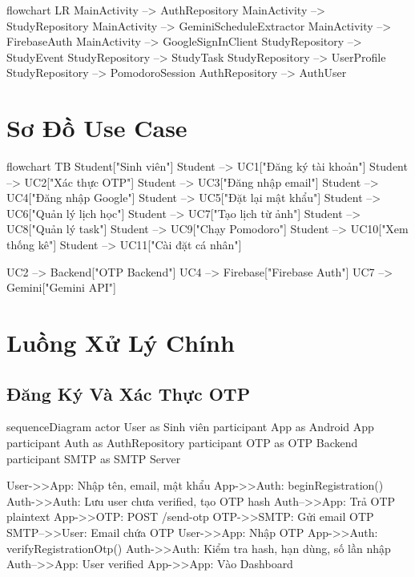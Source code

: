 \documentclass[12pt,a4paper]{report}
\begin{document}
\begin{CodeBlock}
flowchart LR
    MainActivity --> AuthRepository
    MainActivity --> StudyRepository
    MainActivity --> GeminiScheduleExtractor
    MainActivity --> FirebaseAuth
    MainActivity --> GoogleSignInClient
    StudyRepository --> StudyEvent
    StudyRepository --> StudyTask
    StudyRepository --> UserProfile
    StudyRepository --> PomodoroSession
    AuthRepository --> AuthUser
\end{CodeBlock}

\section{Sơ Đồ Use Case}

\begin{CodeBlock}
flowchart TB
    Student["Sinh viên"]
    Student --> UC1["Đăng ký tài khoản"]
    Student --> UC2["Xác thực OTP"]
    Student --> UC3["Đăng nhập email"]
    Student --> UC4["Đăng nhập Google"]
    Student --> UC5["Đặt lại mật khẩu"]
    Student --> UC6["Quản lý lịch học"]
    Student --> UC7["Tạo lịch từ ảnh"]
    Student --> UC8["Quản lý task"]
    Student --> UC9["Chạy Pomodoro"]
    Student --> UC10["Xem thống kê"]
    Student --> UC11["Cài đặt cá nhân"]

    UC2 --> Backend["OTP Backend"]
    UC4 --> Firebase["Firebase Auth"]
    UC7 --> Gemini["Gemini API"]
\end{CodeBlock}

\section{Luồng Xử Lý Chính}

\subsection{Đăng Ký Và Xác Thực OTP}

\begin{CodeBlock}
sequenceDiagram
    actor User as Sinh viên
    participant App as Android App
    participant Auth as AuthRepository
    participant OTP as OTP Backend
    participant SMTP as SMTP Server

    User->>App: Nhập tên, email, mật khẩu
    App->>Auth: beginRegistration()
    Auth->>Auth: Lưu user chưa verified, tạo OTP hash
    Auth-->>App: Trả OTP plaintext
    App->>OTP: POST /send-otp
    OTP->>SMTP: Gửi email OTP
    SMTP-->>User: Email chứa OTP
    User->>App: Nhập OTP
    App->>Auth: verifyRegistrationOtp()
    Auth->>Auth: Kiểm tra hash, hạn dùng, số lần nhập
    Auth-->>App: User verified
    App->>App: Vào Dashboard
\end{CodeBlock}
\end{document}
